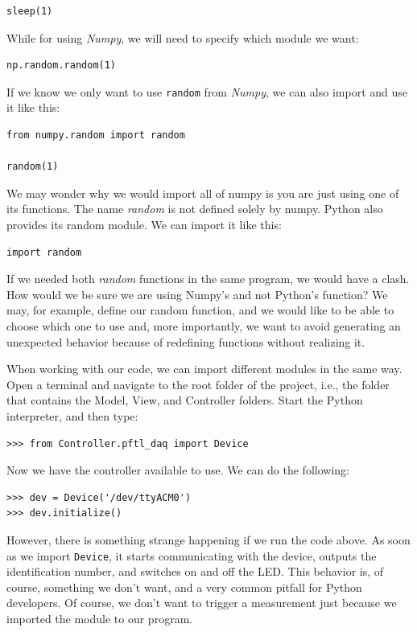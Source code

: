 \begin{verbatim}
sleep(1)
\end{verbatim}

While for using \emph{Numpy}, we will need to specify which module we want:

\begin{verbatim}
np.random.random(1)
\end{verbatim}

If we know we only want to use \texttt{random} from \emph{Numpy}, we can also import and use it like this:

\begin{verbatim}
from numpy.random import random

random(1)
\end{verbatim}

We may wonder why we would import all of numpy is you are just using one of its functions. The name \emph{random} is not defined solely by numpy. Python also provides its random module. We can import it like this:

\begin{verbatim}
import random
\end{verbatim}

If we needed both \emph{random} functions in the same program, we would have a clash. How would we be sure we are using Numpy's and not Python's function? We may, for example, define our random function, and we would like to be able to choose which one to use and, more importantly, we want to avoid generating an unexpected behavior because of redefining functions without realizing it.

When working with our code, we can import different modules in the same way. Open a terminal and navigate to the root folder of the project, i.e., the folder that contains the Model, View, and Controller folders. Start the Python interpreter, and then type:

\begin{verbatim}
>>> from Controller.pftl_daq import Device
\end{verbatim}

Now we have the controller available to use. We can do the following:

\begin{verbatim}
>>> dev = Device('/dev/ttyACM0')
>>> dev.initialize()
\end{verbatim}

However, there is something strange happening if we run the code above. As soon as we import \texttt{Device}, it starts communicating with the device, outputs the identification number, and switches on and off the LED. This behavior is, of course, something we don't want, and a very common pitfall for Python developers. Of course, we don't want to trigger a measurement just because we imported the module to our program.


